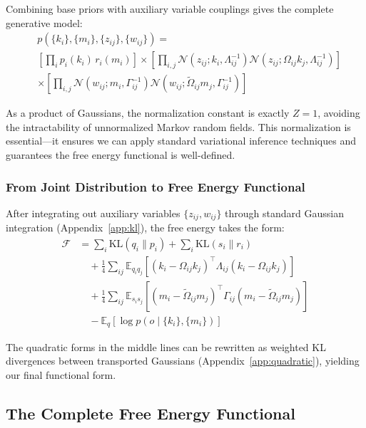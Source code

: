 \documentclass[11pt]{article}
\begin{document}
Combining base priors with auxiliary variable couplings gives the complete generative model:
\begin{equation}
\boxed{
\begin{aligned}
&p(\{k_i\}, \{m_i\}, \{z_{ij}\}, \{w_{ij}\}) = \\
&\left[\prod_i p_i(k_i) \, r_i(m_i)\right] \times \left[\prod_{i,j} \mathcal{N}(z_{ij}; k_i, \Lambda_{ij}^{-1}) \mathcal{N}(z_{ij}; \Omega_{ij}k_j, \Lambda_{ij}^{-1})\right] \\
&\times \left[\prod_{i,j} \mathcal{N}(w_{ij}; m_i, \Gamma_{ij}^{-1}) \mathcal{N}(w_{ij}; \tilde{\Omega}_{ij}m_j, \Gamma_{ij}^{-1})\right]
\end{aligned}
}
\end{equation}

As a product of Gaussians, the normalization constant is exactly $Z = 1$, avoiding the intractability of unnormalized Markov random fields. This normalization is essential---it ensures we can apply standard variational inference techniques and guarantees the free energy functional is well-defined.

\subsubsection{From Joint Distribution to Free Energy Functional}

After integrating out auxiliary variables $\{z_{ij}, w_{ij}\}$ through standard Gaussian integration (Appendix~\ref{app:kl}), the free energy takes the form:
\begin{equation}
\begin{aligned}
\mathcal{F} &= \sum_i \mathrm{KL}(q_i \| p_i) + \sum_i \mathrm{KL}(s_i \| r_i) \\
&\quad + \frac{1}{4}\sum_{ij} \mathbb{E}_{q_i q_j}[(k_i - \Omega_{ij}k_j)^\top \Lambda_{ij}(k_i - \Omega_{ij}k_j)] \\
&\quad + \frac{1}{4}\sum_{ij} \mathbb{E}_{s_i s_j}[(m_i - \tilde{\Omega}_{ij}m_j)^\top \Gamma_{ij}(m_i - \tilde{\Omega}_{ij}m_j)] \\
&\quad - \mathbb{E}_q[\log p(o \mid \{k_i\}, \{m_i\})]
\end{aligned}
\end{equation}

The quadratic forms in the middle lines can be rewritten as weighted KL divergences between transported Gaussians (Appendix~\ref{app:quadratic}), yielding our final functional form.

\subsection{The Complete Free Energy Functional}
\end{document}
